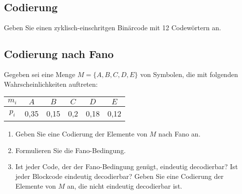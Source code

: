 \documentclass{exercisesheet}
\begin{document}
  \begin{solution}
  \end{solution}


    \subsection{Codierung}
      Geben Sie einen zyklisch-einschritgen Binärcode mit 12 Codewörtern an.

    \subsection{Codierung nach Fano}
      Gegeben sei eine Menge $M = \{A, B, C, D, E\}$ von Symbolen, die mit folgenden Wahrscheinlichkeiten auftreten:
      \begin{center}
        \begin{tabular}{c|ccccc}
          $m_i$ & $A$ & $B$ & $C$ & $D$ & $E$\\
          \hline
          $p_i$ & 0,35 & 0,15 & 0,2 & 0,18 & 0,12\\
        \end{tabular}
      \end{center}
      \begin{enumerate}
        \item\label{fano:1} Geben Sie eine Codierung der Elemente von $M$ nach Fano an.
        \item Formulieren Sie die Fano-Bedingung.
        \item Ist jeder Code, der der Fano-Bedingung genügt, eindeutig decodierbar? Ist jeder Blockcode eindeutig decodierbar? Geben Sie eine Codierung der Elemente von $M$ an, die nicht eindeutig decodierbar ist.
      \end{enumerate}
\end{document}
